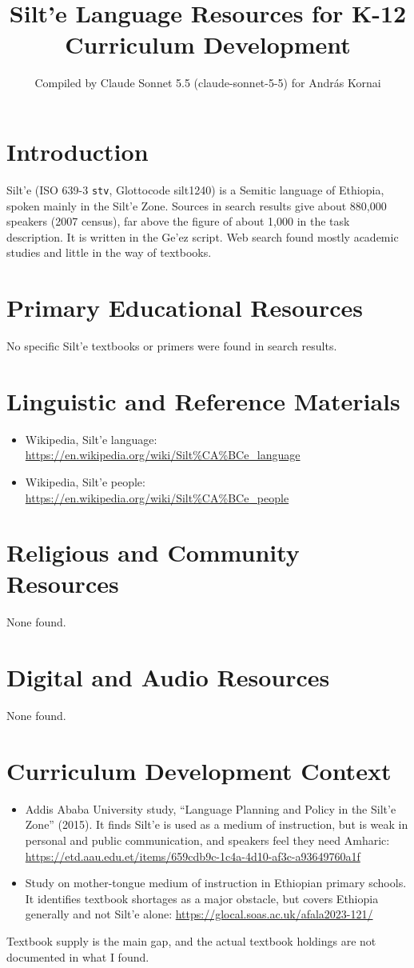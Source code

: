 \documentclass[12pt]{article}
\title{Silt'e Language Resources for K-12 Curriculum Development}
\author{Compiled by Claude Sonnet 5.5 (claude-sonnet-5-5) for Andr\'as Kornai}
\date{}
\begin{document}
\maketitle

\section{Introduction}
Silt'e (ISO 639-3 \texttt{stv}, Glottocode silt1240) is a Semitic language of Ethiopia, spoken mainly in the Silt'e Zone. Sources in search results give about 880,000 speakers (2007 census), far above the figure of about 1,000 in the task description. It is written in the Ge'ez script. Web search found mostly academic studies and little in the way of textbooks.

\section{Primary Educational Resources}
No specific Silt'e textbooks or primers were found in search results.

\section{Linguistic and Reference Materials}
\begin{itemize}
\item Wikipedia, Silt'e language: \url{https://en.wikipedia.org/wiki/Silt%CA%BCe_language}
\item Wikipedia, Silt'e people: \url{https://en.wikipedia.org/wiki/Silt%CA%BCe_people}
\end{itemize}

\section{Religious and Community Resources}
None found.

\section{Digital and Audio Resources}
None found.

\section{Curriculum Development Context}
\begin{itemize}
\item Addis Ababa University study, ``Language Planning and Policy in the Silt'e Zone'' (2015). It finds Silt'e is used as a medium of instruction, but is weak in personal and public communication, and speakers feel they need Amharic: \url{https://etd.aau.edu.et/items/659cdb9c-1c4a-4d10-af3c-a93649760a1f}
\item Study on mother-tongue medium of instruction in Ethiopian primary schools. It identifies textbook shortages as a major obstacle, but covers Ethiopia generally and not Silt'e alone: \url{https://glocal.soas.ac.uk/afala2023-121/}
\end{itemize}
Textbook supply is the main gap, and the actual textbook holdings are not documented in what I found.
\end{document}
